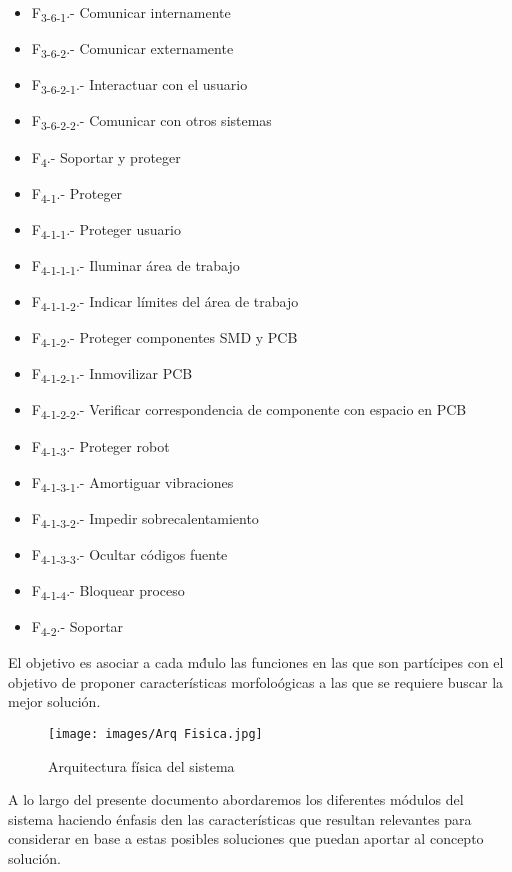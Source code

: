 \begin{itemize}
\item F\textsubscript{3-6-1}.- Comunicar internamente
\item F\textsubscript{3-6-2}.- Comunicar externamente
\item F\textsubscript{3-6-2-1}.- Interactuar con el usuario
\item F\textsubscript{3-6-2-2}.- Comunicar con otros sistemas
\\
\item F\textsubscript{4}.- Soportar y proteger
\item F\textsubscript{4-1}.- Proteger
\item F\textsubscript{4-1-1}.- Proteger usuario
\item F\textsubscript{4-1-1-1}.- Iluminar \'area de trabajo
\item F\textsubscript{4-1-1-2}.- Indicar l\'imites del \'area de trabajo
\item F\textsubscript{4-1-2}.- Proteger componentes SMD y PCB
\item F\textsubscript{4-1-2-1}.- Inmovilizar PCB
\item F\textsubscript{4-1-2-2}.- Verificar correspondencia de componente con espacio en PCB
\item F\textsubscript{4-1-3}.- Proteger robot
\item F\textsubscript{4-1-3-1}.- Amortiguar vibraciones
\item F\textsubscript{4-1-3-2}.- Impedir sobrecalentamiento
\item F\textsubscript{4-1-3-3}.- Ocultar c\'odigos fuente
\item F\textsubscript{4-1-4}.- Bloquear proceso
\item F\textsubscript{4-2}.- Soportar
\end{itemize}

El objetivo es asociar a cada m\'dulo las funciones en las que son part\'icipes con el objetivo de  proponer caracter\'isticas morfolo\'ogicas a las que se requiere buscar la mejor soluci\'on.

\begin{figure}[hbtp]
\centering
\texttt{[image: images/Arq Fisica.jpg]} 
\caption{Arquitectura f\'isica del sistema}

\end{figure}

A lo largo del presente documento abordaremos los diferentes m\'odulos del sistema haciendo \'enfasis den las caracter\'isticas que resultan relevantes para considerar en base a estas posibles soluciones que puedan aportar al concepto soluci\'on.
